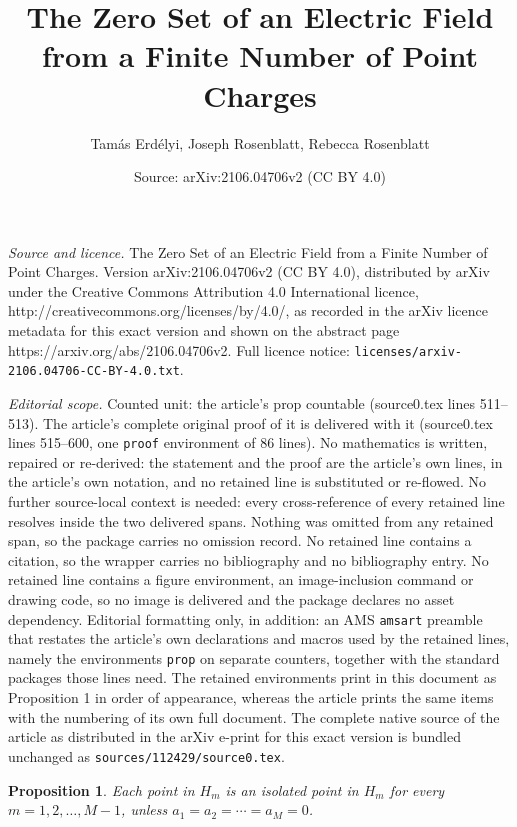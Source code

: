 \documentclass[10pt,a4paper]{amsart}
\title{The Zero Set of an Electric Field from a Finite Number of Point Charges}
\author{Tam\'as Erd\'elyi, Joseph Rosenblatt, Rebecca Rosenblatt}
\date{Source: arXiv:2106.04706v2 (CC BY 4.0)}
\newtheorem{prop}{Proposition}
\begin{document}
\maketitle

\noindent\emph{Source and licence.} The Zero Set of an Electric Field from a Finite Number of Point Charges. Version arXiv:2106.04706v2 (CC BY 4.0), distributed by arXiv under the Creative Commons Attribution 4.0 International licence, http://creativecommons.org/licenses/by/4.0/, as recorded in the arXiv licence metadata for this exact version and shown on the abstract page https://arxiv.org/abs/2106.04706v2. Full licence notice: \texttt{licenses/arxiv-2106.04706-CC-BY-4.0.txt}.\par\smallskip

\noindent\textit{Editorial scope.} Counted unit: the article's prop countable (source0.tex lines 511--513). The article's complete original proof of it is delivered with it (source0.tex lines 515--600, one \texttt{proof} environment of 86 lines). No mathematics is written, repaired or re-derived: the statement and the proof are the article's own lines, in the article's own notation, and no retained line is substituted or re-flowed.  No further source-local context is needed: every cross-reference of every retained line resolves inside the two delivered spans.  Nothing was omitted from any retained span, so the package carries no omission record.  No retained line contains a citation, so the wrapper carries no bibliography and no bibliography entry.  No retained line contains a figure environment, an image-inclusion command or drawing code, so no image is delivered and the package declares no asset dependency.  Editorial formatting only, in addition: an AMS \texttt{amsart} preamble that restates the article's own declarations and macros used by the retained lines, namely the environments \texttt{prop} on separate counters, together with the standard packages those lines need.  The retained environments print in this document as Proposition 1 in order of appearance, whereas the article prints the same items with the numbering of its own full document.  The complete native source of the article as distributed in the arXiv e-print for this exact version is bundled unchanged as \texttt{sources/112429/source0.tex}.
\begin{prop}\label{countable}
Each point in $H_m$ is an isolated point in $H_m$ for every $m=1,2,\ldots,M-1$, unless $a_1=a_2= \cdots =a_M = 0$.
\end{prop}
\end{document}
